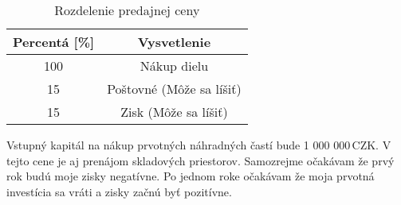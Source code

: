 \begin{table}[htbp]
  \centering
  \caption{Rozdelenie predajnej ceny}
  \label{rozdelenie_ceny}
  \begin{tabular}{|c|c|}
    \hline
    Percentá [\%] & Vysvetlenie \\
    \hline
    \hline
    100 & Nákup dielu \\
    \hline
    15 & Poštovné (Môže sa líšiť) \\
    \hline
    15 & Zisk (Môže sa líšiť) \\
    \hline
  \end{tabular}
\end{table}

Vstupný kapitál na nákup prvotných náhradných častí bude 1 000 000\,CZK. V tejto cene je aj prenájom skladových priestorov. Samozrejme očakávam že prvý rok budú moje zisky negatívne. Po jednom roke očakávam že moja prvotná investícia sa vráti a zisky začnú byť pozitívne.
